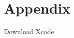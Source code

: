 \documentclass[11pt]{article}
\begin{document}
            \paragraph{}

        
\newpage
\let\Section\section 
\def\section*#1{\Section{#1}}  

    
    
\newpage
\Section{Appendix}
Download Xcode
        
\end{document}
